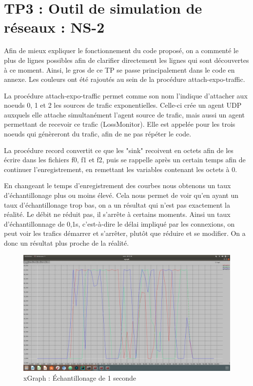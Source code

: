 \chapter{TP3 : Outil de simulation de réseaux : NS-2}
  Afin de mieux expliquer le fonctionnement du code proposé, on a commenté le plus de lignes possibles afin de clarifier directement les lignes qui sont découvertes à ce moment. Ainsi, le gros de ce TP se passe principalement dans le code en annexe. Les couleurs ont été rajoutés au sein de la procédure attach-expo-traffic.

  La procédure attach-expo-traffic permet comme son nom l'indique d'attacher aux noeuds 0, 1 et 2 les sources de trafic exponentielles. Celle-ci crée un agent UDP auxquels elle attache simultanément l'agent source de trafic, mais aussi un agent permettant de recevoir ce trafic (LossMonitor). Elle est appelée pour les trois noeuds qui génèreront du trafic, afin de ne pas répéter le code.

  La procédure record convertit ce que les "sink" recoivent en octets afin de les écrire dans les fichiers f0, f1 et f2, puis se rappelle après un certain temps afin de continuer l'enregistrement, en remettant les variables contenant les octets à 0.

  En changeant le temps d'enregistrement des courbes nous obtenons un taux d'échantillonage plus ou moins élevé. Cela nous permet de voir qu'en ayant un taux d'échantillonage trop bas, on a un résultat qui n'est pas exactement la réalité. Le débit ne réduit pas, il s'arrête à certains moments. Ainsi un taux d'échantillonnage de 0,1s, c'est-à-dire le délai impliqué par les connexions, on peut voir les trafics démarrer et s'arrêter, plutôt que réduire et se modifier. On a donc un résultat plus proche de la réalité.
  \clearpage
  \begin{figure}
    \centering
      \includegraphics[width=0.99\columnwidth]{./tp3/1,0.png}
      \caption{xGraph : Échantillonage de 1 seconde}
  \end{figure}


